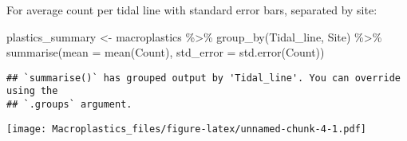 \documentclass[
]{article}
\newenvironment{Shaded}{\begin{snugshade}}{\end{snugshade}}
\newcommand{\AttributeTok}[1]{\textcolor[rgb]{0.77,0.63,0.00}{#1}}
\newcommand{\FloatTok}[1]{\textcolor[rgb]{0.00,0.00,0.81}{#1}}
\newcommand{\FunctionTok}[1]{\textcolor[rgb]{0.00,0.00,0.00}{#1}}
\newcommand{\NormalTok}[1]{#1}
\newcommand{\OtherTok}[1]{\textcolor[rgb]{0.56,0.35,0.01}{#1}}
\newcommand{\SpecialCharTok}[1]{\textcolor[rgb]{0.00,0.00,0.00}{#1}}
\newcommand{\StringTok}[1]{\textcolor[rgb]{0.31,0.60,0.02}{#1}}
\begin{document}
For average count per tidal line with standard error bars, separated by
site:

\begin{Shaded}
\begin{Highlighting}[]
\NormalTok{plastics\_summary }\OtherTok{\textless{}{-}}\NormalTok{ macroplastics }\SpecialCharTok{\%\textgreater{}\%} 
  \FunctionTok{group\_by}\NormalTok{(Tidal\_line, Site) }\SpecialCharTok{\%\textgreater{}\%} 
  \FunctionTok{summarise}\NormalTok{(}\AttributeTok{mean =} \FunctionTok{mean}\NormalTok{(Count), }\AttributeTok{std\_error =} \FunctionTok{std.error}\NormalTok{(Count))}
\end{Highlighting}
\end{Shaded}

\begin{verbatim}
## `summarise()` has grouped output by 'Tidal_line'. You can override using the
## `.groups` argument.
\end{verbatim}

\begin{Shaded}
\end{Shaded}

\texttt{[image: Macroplastics\_files/figure-latex/unnamed-chunk-4-1.pdf]}
\end{document}
